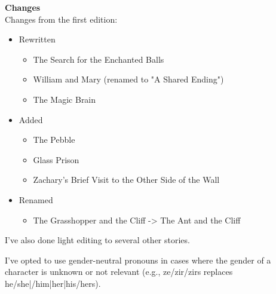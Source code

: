 \huge \textbf{Changes}\\

\large
Changes from the first edition:\\
\begin{itemize}
	\item Rewritten
	\begin{itemize}
		\item The Search for the Enchanted Balls
		\item William and Mary (renamed to "A Shared Ending")
		\item The Magic Brain
	\end{itemize}
	\item Added
	\begin{itemize}
		\item The Pebble
		\item Glass Prison
		\item Zachary's Brief Visit to the Other Side of the Wall
	\end{itemize}
	\item Renamed
	\begin{itemize}
		\item The Grasshopper and the Cliff -> The Ant and the Cliff
	\end{itemize}
\end{itemize}

\vspace{10pt}
I've also done light editing to several other stories.

\vspace{10pt}
I've opted to use gender-neutral pronouns in cases where the gender of a character is unknown or not relevant (e.g., ze/zir/zirs replaces he/she|/him|her|his/hers).